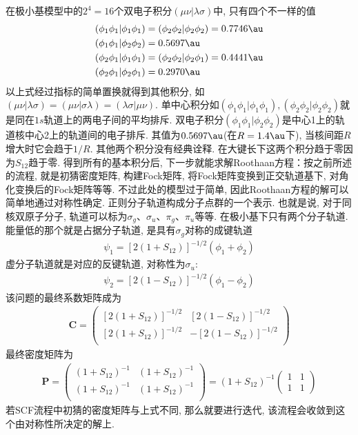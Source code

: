 在极小基模型中的$2^4=16$个双电子积分$(\mu\nu|\lambda\sigma)$中, 
只有四个不一样的值
\begin{equation}
	\begin{split}
		(\phi_1\phi_1|\phi_1\phi_1) & = (\phi_2\phi_2|\phi_2\phi_2) = 0.7746\au\\
		(\phi_1\phi_1|\phi_2\phi_2) & =0.5697\au\\
		(\phi_2\phi_1|\phi_1\phi_1) & =(\phi_2\phi_2|\phi_2\phi_1) = 0.4441\au\\
		(\phi_2\phi_1|\phi_2\phi_1) & =0.2970\au
	\end{split}
\end{equation}
以上式经过指标的简单置换就得到其他积分, 
如$(\mu\nu|\lambda\sigma)=(\mu\nu|\sigma\lambda)=(\lambda\sigma|\mu\nu)$. 
单中心积分如$(\phi_1\phi_1|\phi_1\phi_1),(\phi_2\phi_2|\phi_2\phi_2)$就是同在$1s$轨道上的两电子间的平均排斥. 
双电子积分$(\phi_1\phi_1|\phi_2\phi_2)$是中心1上的轨道核中心2上的轨道间的电子排斥. 
其值为$0.5697\au$(在$R=1.4\au$下), 
当核间距$R$增大时它会趋于$1/R$. 
其他两个积分没有经典诠释. 
在大键长下这两个积分趋于零因为$S_{12}$趋于零. 
得到所有的基本积分后, 
下一步就能求解Roothaan方程：按之前所述的流程, 
就是初猜密度矩阵, 
构建Fock矩阵, 
将Fock矩阵变换到正交轨道基下, 
对角化变换后的Fock矩阵等等. 
不过此处的模型过于简单, 
因此Roothaan方程的解可以简单地通过对称性确定. 
正则分子轨道构成分子点群的一个表示. 
也就是说, 
对于同核双原子分子, 
轨道可以标为$\sigma_g$、$\sigma_u$、$\pi_g$、$\pi_u$等等. 
在极小基下只有两个分子轨道. 
能量低的那个就是占据分子轨道, 
是具有$\sigma_g$对称的成键轨道
\begin{align}
	\psi_1 = [2(1+S_{12})]^{-1/2}(\phi_1+\phi_2)
\end{align}
虚分子轨道就是对应的反键轨道, 
对称性为$\sigma_u$:
\begin{align}
	\psi_2 = [2(1-S_{12})]^{-1/2}(\phi_1-\phi_2)
\end{align}
该问题的最终系数矩阵成为
\begin{align}
	\mathbf{C}=
	\begin{pmatrix}
		[2(1+S_{12})]^{-1/2} & [2(1-S_{12})]^{-1/2}\\
		[2(1+S_{12})]^{-1/2} & -[2(1-S_{12})]^{-1/2}\\
	\end{pmatrix}
\end{align}
最终密度矩阵为
\begin{align}
	\mathbf{P}=
	\begin{pmatrix}
		(1+S_{12})^{-1} & (1+S_{12})^{-1} \\
		(1+S_{12})^{-1} & (1+S_{12})^{-1} \\
	\end{pmatrix}
	=(1+S_{12})^{-1} 
	\begin{pmatrix}
		1&1\\1&1
	\end{pmatrix}
\end{align}
若SCF流程中初猜的密度矩阵与上式不同, 
那么就要进行迭代, 
该流程会收敛到这个由对称性所决定的解上.

